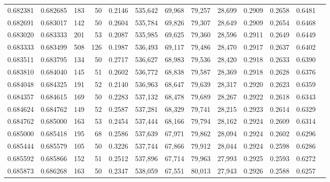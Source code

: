 \begin{tabular}{rrrrrrrrrrrrr}
0.682381 & 0.682685 &    183 &    50 &                                     0.2146 & 535,642 &  69,968 &  79,257 &  28,699 & 0.2909 & 0.2658 & 0.6481 \\
0.682691 & 0.683017 &    142 &    50 &                                     0.2604 & 535,784 &  69,826 &  79,307 &  28,649 & 0.2909 & 0.2654 & 0.6468 \\
0.683020 & 0.683333 &    201 &    53 &                                     0.2087 & 535,985 &  69,625 &  79,360 &  28,596 & 0.2911 & 0.2649 & 0.6449 \\
0.683333 & 0.683499 &    508 &   126 &                                     0.1987 & 536,493 &  69,117 &  79,486 &  28,470 & 0.2917 & 0.2637 & 0.6402 \\
0.683511 & 0.683795 &    134 &    50 &                                     0.2717 & 536,627 &  68,983 &  79,536 &  28,420 & 0.2918 & 0.2633 & 0.6390 \\
0.683810 & 0.684040 &    145 &    51 &                                     0.2602 & 536,772 &  68,838 &  79,587 &  28,369 & 0.2918 & 0.2628 & 0.6376 \\
0.684048 & 0.684325 &    191 &    52 &                                     0.2140 & 536,963 &  68,647 &  79,639 &  28,317 & 0.2920 & 0.2623 & 0.6359 \\
0.684357 & 0.684615 &    169 &    50 &                                     0.2283 & 537,132 &  68,478 &  79,689 &  28,267 & 0.2922 & 0.2618 & 0.6343 \\
0.684624 & 0.684762 &    149 &    52 &                                     0.2587 & 537,281 &  68,329 &  79,741 &  28,215 & 0.2923 & 0.2614 & 0.6329 \\
0.684762 & 0.685000 &    163 &    53 &                                     0.2454 & 537,444 &  68,166 &  79,794 &  28,162 & 0.2924 & 0.2609 & 0.6314 \\
0.685000 & 0.685418 &    195 &    68 &                                     0.2586 & 537,639 &  67,971 &  79,862 &  28,094 & 0.2924 & 0.2602 & 0.6296 \\
0.685444 & 0.685579 &    105 &    50 &                                     0.3226 & 537,744 &  67,866 &  79,912 &  28,044 & 0.2924 & 0.2598 & 0.6286 \\
0.685592 & 0.685866 &    152 &    51 &                                     0.2512 & 537,896 &  67,714 &  79,963 &  27,993 & 0.2925 & 0.2593 & 0.6272 \\
0.685873 & 0.686268 &    163 &    50 &                                     0.2347 & 538,059 &  67,551 &  80,013 &  27,943 & 0.2926 & 0.2588 & 0.6257 \\

\end{tabular}
